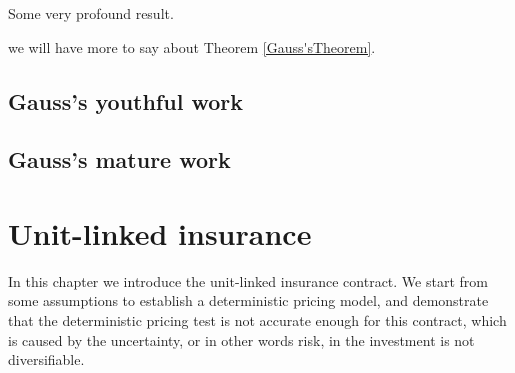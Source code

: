 \documentclass{report}
\begin{document}
\begin{ttt}[Gauss]    \label{Gauss'sTheorem}
Some very profound result.
\end{ttt}


we will have more to say about Theorem \ref{Gauss'sTheorem}.


\section{Gauss's youthful work}




\section{Gauss's mature work}













\chapter{Unit-linked insurance}     \label{unit-linked}








In this chapter we introduce the unit-linked insurance contract. We start from some assumptions to establish a deterministic pricing model, and demonstrate that the deterministic pricing test is not accurate enough for this contract, which is caused by the uncertainty, or in other words risk, in the investment is not diversifiable.  
\end{document}
